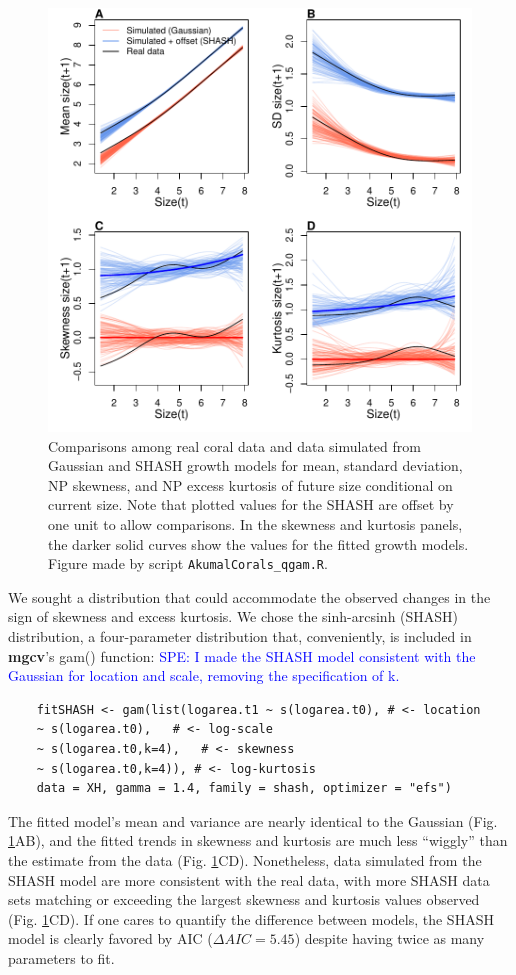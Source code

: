 \documentclass[12pt]{article}
\newcommand{\comment}{\textcolor{blue}}
\begin{document}
\begin{figure}[tbp]
	\centering
	\includegraphics[width=1.0\textwidth]{figures/coral_SHASH_fit.pdf}
	\caption{Comparisons among real coral data and data simulated from Gaussian and SHASH growth models for mean, 
	standard deviation, NP skewness, and NP excess kurtosis of future size conditional on current size. Note that plotted values for the SHASH are offset by one unit to allow comparisons. 
	In the skewness and kurtosis panels, the darker solid curves show the values for the fitted growth models. 
	Figure made by script \texttt{AkumalCorals\_qgam.R}.}
	\label{fig:coral_fit}
\end{figure} 

We sought a distribution that could accommodate the observed changes in the sign of skewness and excess kurtosis. We chose the sinh-arcsinh (SHASH) distribution, a four-parameter distribution that, 
conveniently, is included in \textbf{mgcv}'s gam() function: \comment{SPE: I made the SHASH model consistent with the Gaussian for location and scale, removing the specification of k.} 
\begin{lstlisting}
	fitSHASH <- gam(list(logarea.t1 ~ s(logarea.t0), # <- location 
	~ s(logarea.t0),   # <- log-scale
	~ s(logarea.t0,k=4),   # <- skewness
	~ s(logarea.t0,k=4)), # <- log-kurtosis
	data = XH, gamma = 1.4, family = shash, optimizer = "efs")
\end{lstlisting}
The fitted model's mean and variance are nearly identical to the Gaussian (Fig. \ref{fig:coral_fit}AB), and the fitted trends in skewness and kurtosis are much less ``wiggly'' than the estimate from the data (Fig. \ref{fig:coral_fit}CD). 
Nonetheless, data simulated from the SHASH model are more consistent with the real data, with more SHASH data sets matching or exceeding the largest skewness and kurtosis values observed (Fig. \ref{fig:coral_fit}CD). 
If one cares to quantify the difference between models, the SHASH model is clearly favored by AIC ($\Delta AIC = 5.45$) despite having twice as many parameters to fit. 
 
\end{document}
